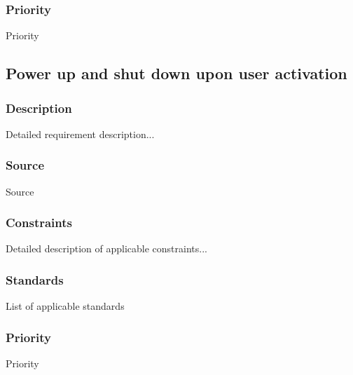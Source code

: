 \subsubsection{Priority}
Priority

\subsection{Power up and shut down upon user activation }
\subsubsection{Description}
Detailed requirement description...
\subsubsection{Source}
Source
\subsubsection{Constraints}
Detailed description of applicable constraints...
\subsubsection{Standards}
List of applicable standards
\subsubsection{Priority}
Priority
